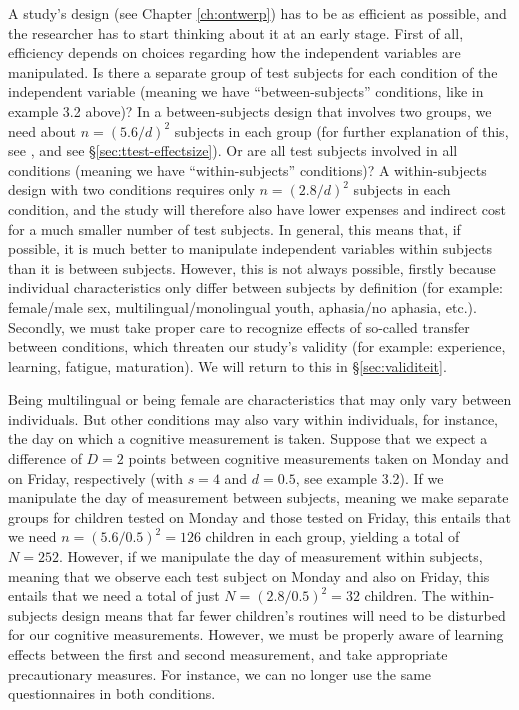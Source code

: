 \documentclass[
]{book}
\begin{document}
A study's design (see Chapter \ref{ch:ontwerp}) has to be as efficient as possible, and the researcher has to start thinking about it at an early stage. First of all, efficiency depends on choices regarding how the independent variables are manipulated. Is there a separate group of test subjects for each condition of the independent variable (meaning we have ``between-subjects'' conditions, like in example 3.2 above)? In a between-subjects design that involves two groups, we need about \(n = (5.6/d)^2\) subjects in each group (for further explanation of this, see \citet{Gelm07}, and see §\ref{sec:ttest-effectsize}). Or are all test subjects involved in all conditions (meaning we have ``within-subjects'' conditions)? A within-subjects design with two conditions requires only \(n = (2.8/d)^2\) subjects in each condition, and the study will therefore also have lower expenses and indirect cost for a much smaller number of test subjects. In general, this means that, if possible, it is much better to manipulate independent variables within subjects than it is between subjects. However, this is not always possible, firstly because individual characteristics only differ between subjects by definition (for example: female/male sex, multilingual/monolingual youth, aphasia/no aphasia, etc.). Secondly, we must take proper care to recognize effects of so-called transfer between conditions, which threaten our study's validity (for example: experience, learning, fatigue, maturation). We will return to this in §\ref{sec:validiteit}.

Being multilingual or being female are characteristics that may only vary between individuals. But other conditions may also vary within individuals, for instance, the day on which a cognitive measurement is taken. Suppose that we expect a difference of \(D = 2\) points between cognitive measurements taken on Monday and on Friday, respectively (with \(s = 4\) and \(d = 0.5\), see example 3.2). If we manipulate the day of measurement between subjects, meaning we make separate groups for children tested on Monday and those tested on Friday, this entails that we need \(n = (5.6/0.5)^2 = 126\) children in each group, yielding a total of \(N = 252\). However, if we manipulate the day of measurement within subjects, meaning that we observe each test subject on Monday and also on Friday, this entails that we need a total of just \(N = (2.8/0.5)^2 = 32\) children. The within-subjects design means that far fewer children's routines will need to be disturbed for our cognitive measurements. However, we must be properly aware of learning effects between the first and second measurement, and take appropriate precautionary measures. For instance, we can no longer use the same questionnaires in both conditions.
\end{document}

